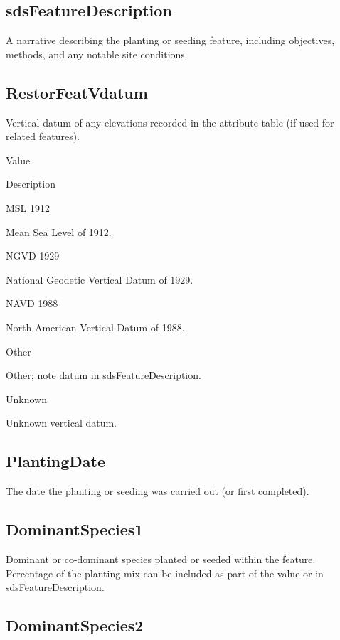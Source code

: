 \documentclass[
  letterpaper,
  DIV=11,
  numbers=noendperiod]{scrreprt}
\begin{document}
\subsection{sdsFeatureDescription}\label{sdsfeaturedescription-4}

A narrative describing the planting or seeding feature, including
objectives, methods, and any notable site conditions.

\subsection{RestorFeatVdatum}\label{restorfeatvdatum-4}

Vertical datum of any elevations recorded in the attribute table (if
used for related features).

Value

Description

MSL 1912

Mean Sea Level of 1912.

NGVD 1929

National Geodetic Vertical Datum of 1929.

NAVD 1988

North American Vertical Datum of 1988.

Other

Other; note datum in sdsFeatureDescription.

Unknown

Unknown vertical datum.

\subsection{PlantingDate}\label{plantingdate}

The date the planting or seeding was carried out (or first completed).

\subsection{DominantSpecies1}\label{dominantspecies1}

Dominant or co-dominant species planted or seeded within the feature.
Percentage of the planting mix can be included as part of the value or
in sdsFeatureDescription.

\subsection{DominantSpecies2}\label{dominantspecies2}
\end{document}
